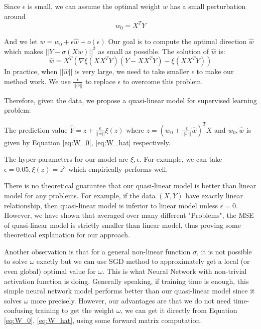 \documentclass{article}
\begin{document}
Since $\epsilon$ is small, we can assume the optimal weight $w$ has a small perturbation around
\begin{equation}\label{eq:W_0}
w_0 = X^T Y
\end{equation}


And we let $w=w_0 + \epsilon \hat{w} + o(\epsilon)$ Our goal is to compute the optimal direction $\hat{w}$ which makes
$||Y-\sigma(Xw)||^2$ as small as possible.
The solution of $\hat{w}$ is:
\begin{equation}\label{eq:W_hat}
\hat{w} = X^T\left(\nabla \xi(XX^TY)(Y-XX^TY) - \xi(XX^TY)
\right)
\end{equation}
In practice, when $||\hat{w}||$ is very large, we need to take smaller $\epsilon$ to make our method work. We use 
$\frac{\epsilon}{||\hat{w}||} $ to replace $\epsilon$ to overcome this problem.

Therefore, given the data, we propose a quasi-linear model for supervised learning problem:

The prediction value $\hat{Y} = z + \frac{\epsilon}{||\hat{w}||} \xi(z) $ where $z = (w_0 + \frac{\epsilon}{||\hat{w}||} \hat{w})^T X$ and $w_0, \hat{w}$ is given by
Equation \eqref{eq:W_0}, \eqref{eq:W_hat} respectively.

The hyper-parameters for our model are $\xi, \epsilon$. For example, we can take $\epsilon = 0.05, \xi(z) = z^3$ which empirically performs well.

There is no theoretical guarantee that our quasi-linear model is better than linear model for any problems. For example, if the data $(X,Y)$ have exactly
linear relationship, then quasi-linear model is inferior to linear model unless $\epsilon = 0$. However, we have shown that averaged over many different "Problems",
the MSE of quasi-linear model is strictly smaller than linear model, thus proving some theoretical explanation for our approach.

Another observation is that for a general non-linear function $\sigma$, it is not possible to solve $\omega$ exactly but we can use SGD method
to approximately get a local (or even global) optimal value for $\omega$. This is what Neural Network with non-trivial activation function is doing.
Generally speaking, if training time is enough, this simple neural network model performs better than our quasi-linear model since it solves $\omega$ more precisely.
However, our advantages are that we do not need time-confusing training to get the weight $\omega$, we can get it directly from Equation \eqref{eq:W_0}, \eqref{eq:W_hat}, using some forward matrix computation.



\end{document}
